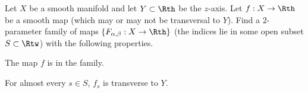 Let $X$ be a smooth manifold and let $Y\subset \Rth$ be the
$z$-axis. Let $f:X\rightarrow \Rth$ be a smooth map (which may or may
not be transversal to $Y$). Find a $2$-parameter family of maps
$\{F_{\alpha,\beta}:X \rightarrow \Rth\}$ (the indices lie in some
open subset $S\subset \Rtw$) with the following properties.
\begin{alist}
\item The map $f$ is in the family.
\item For almost every $s\in S$, $f_s$ is transverse to $Y$. 
\end{alist}

